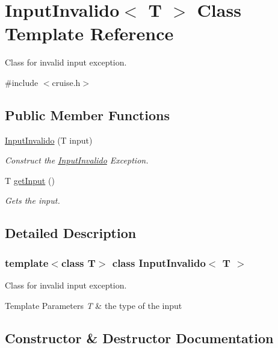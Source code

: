 \hypertarget{classInputInvalido}{}\section{Input\+Invalido$<$ T $>$ Class Template Reference}
\label{classInputInvalido}


Class for invalid input exception.  




{\ttfamily \#include $<$cruise.\+h$>$}

\subsection*{Public Member Functions}
\begin{DoxyCompactItemize}
\item 
\hyperlink{classInputInvalido_a3077f2e208846d100a9a4f9a2775a04f}{Input\+Invalido} (T input)
\begin{DoxyCompactList}\small\item\em Construct the \hyperlink{classInputInvalido}{Input\+Invalido} Exception. \end{DoxyCompactList}\item 
T \hyperlink{classInputInvalido_a2e276c01dd51ca8d2a9adecb66fe921a}{get\+Input} ()
\begin{DoxyCompactList}\small\item\em Gets the input. \end{DoxyCompactList}\end{DoxyCompactItemize}


\subsection{Detailed Description}
\subsubsection*{template$<$class T$>$\newline
class Input\+Invalido$<$ T $>$}

Class for invalid input exception. 


\begin{DoxyTemplParams}{Template Parameters}
{\em T} & the type of the input \\
\hline
\end{DoxyTemplParams}


\subsection{Constructor \& Destructor Documentation}
\mbox{\label{classInputInvalido_a3077f2e208846d100a9a4f9a2775a04f}} 
